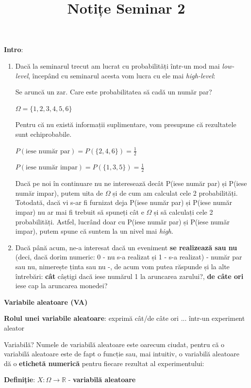 \documentclass[12pt]{article}
\title{%
	\textbf{Notițe Seminar 2}}
\begin{document}
	
	\maketitle
	
	\textbf{\large{Intro}}:
	\begin{enumerate}
		\item 	Dacă la seminarul trecut am lucrat cu probabilități într-un mod mai \textit{low-level}, începând cu seminarul acesta vom lucra cu ele mai \textit{high-level}:
		
		Se aruncă un zar. Care este probabilitatea să cadă un număr par?
		
		$\Omega = \{1,2,3,4,5,6\}$
		
		Pentru că nu există informații suplimentare, vom presupune că rezultatele sunt echiprobabile.
		
		$P(\text{iese număr par}) = P(\{2,4,6\}) = \frac{1}{2}$
		
		$P(\text{iese număr impar}) = P(\{1,3,5\}) = \frac{1}{2}$
		
		Dacă pe noi în continuare nu ne interesează decât P(iese număr par) și P(iese număr impar), putem uita de $\Omega$ și de cum am calculat cele 2 probabilități. Totodată, dacă vi s-ar fi furnizat deja P(iese număr par) și P(iese număr impar) nu ar mai fi trebuit să spuneți cât e $\Omega$ și să calculați cele 2 probabilități. Astfel, lucrând doar cu P(iese număr par) și P(iese număr impar), putem spune că suntem la un nivel mai \textit{high}.
		
		\item 	Dacă până acum, ne-a interesat dacă un eveniment \textbf{se realizează sau nu} (deci, dacă dorim numeric: 0 - nu s-a realizat și 1 - s-a realizat) - număr par sau nu, nimerește ținta sau nu -, de acum vom putea răspunde și la alte întrebări: \textbf{cât} câștigi dacă iese numărul 1 la aruncarea zarului?, \textbf{de câte ori} iese cap la aruncarea monedei?
	\end{enumerate}

	\newpage
	\textbf{\large{Variabile aleatoare (VA)}}
	
	\textbf{Rolul unei variabile aleatoare}: exprimă cât/de câte ori ... într-un experiment aleator
	
	Variabilă? Numele de variabilă aleatoare este oarecum ciudat, pentru că o variabilă aleatoare este de fapt o funcție sau, mai intuitiv, o variabilă aleatoare dă o \textbf{etichetă numerică} pentru fiecare rezultat al experimentului:
	
	\textbf{Definiție}:
	$X : \Omega \rightarrow \mathbb{R}$ - \textbf{variabilă aleatoare}
	
\end{document}

